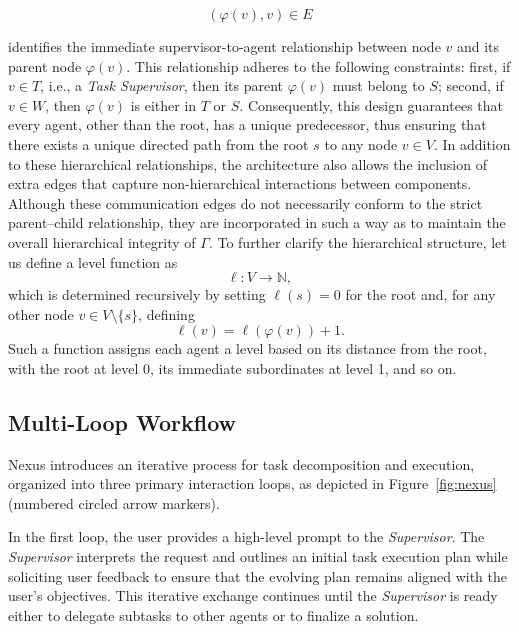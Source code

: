 \begin{equation}
(\varphi(v), v) \in E
\end{equation}

identifies the immediate supervisor-to-agent relationship between node $v$ and its parent node $\varphi(v)$. This relationship adheres to the following constraints: first, if $v \in T$, i.e., a {\em Task Supervisor}, then its parent $\varphi(v)$ must belong to $S$; second, if $v \in W$, then $\varphi(v)$ is either in $T$ or $S$. Consequently, this design guarantees that every agent, other than the root, has a unique predecessor, thus ensuring that there exists a unique directed path from the root $s$ to any node $v \in V$. In addition to these hierarchical relationships, the architecture also allows the inclusion of extra edges that capture non-hierarchical interactions between components. Although these communication edges do not necessarily conform to the strict parent–child relationship, they are incorporated in such a way as to maintain the overall hierarchical integrity of $\Gamma$. To further clarify the hierarchical structure, let us define a level function as 
\begin{equation}
\ell \colon V \to \mathbb{N},
\end{equation}
which is determined recursively by setting \(\ell(s) = 0\) for the root and, for any other node \(v \in V \setminus \{s\}\), defining 
\begin{equation}
\ell(v) = \ell(\varphi(v)) + 1.
\end{equation}
Such a function assigns each agent a level based on its distance from the root, with the root at level 0, its immediate subordinates at level 1, and so on.

\subsection{Multi-Loop Workflow}
Nexus introduces an iterative process for task decomposition and execution, organized into three primary interaction loops, as depicted in Figure~\ref{fig:nexus} (numbered circled arrow markers).

\underline{}
In the first loop, the user provides a high-level prompt to the {\em Supervisor}. The {\em Supervisor} interprets the request and outlines an initial task execution plan while soliciting user feedback to ensure that the evolving plan remains aligned with the user's objectives. This iterative exchange continues until the {\em Supervisor} is ready either to delegate subtasks to other agents or to finalize a solution.

